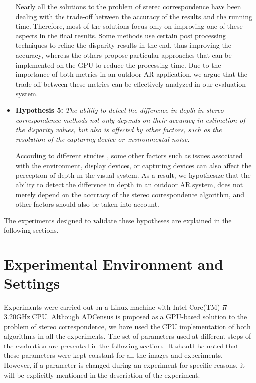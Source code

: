 \begin{itemize}
Nearly all the solutions to the problem of stereo correspondence have been dealing with the trade-off between the accuracy of the results and the running time.
Therefore, most of the solutions focus only on improving one of these aspects in the final results. Some methods use certain post processing techniques to refine the 
disparity results in the end, thus improving the accuracy, whereas the others propose particular approaches that can be implemented on the GPU to reduce the processing time.
Due to the importance of both metrics in an outdoor AR application, we argue that the trade-off between these metrics can be effectively analyzed in our evaluation system.

\item \textbf{Hypothesis 5:} \emph{The ability to detect the difference in depth in stereo correspondence methods not only depends on their accuracy
in estimation of the disparity values, but also is affected by other factors, such as the resolution of the capturing device or environmental noise.}

According to different studies \cite{dras96, kru10,azuma01}, some other factors such as issues associated with the environment, display devices, or capturing devices
can also affect the perception of depth in the visual system. As a result, we hypothesize that the ability to detect the difference in depth in an outdoor AR system,
does not merely depend on the accuracy of the stereo correspondence algorithm, and other factors should also be taken into account.
\end{itemize}
\noindent
The experiments designed to validate these hypotheses are explained in the following sections.

\section{Experimental Environment and Settings}
Experiments were carried out on a Linux machine with Intel Core(TM) i7 3.20GHz CPU. 
Although ADCensus is proposed as a GPU-based solution to the problem of stereo correspondence, 
we have used the CPU implementation of both algorithms in all the experiments.
The set of parameters used at different steps of the evaluation are presented in the following sections.
It should be noted that these parameters were kept constant for all the images and experiments. However, if a parameter is changed during an experiment for specific
reasons, it will be explicitly mentioned in the description of the experiment.

